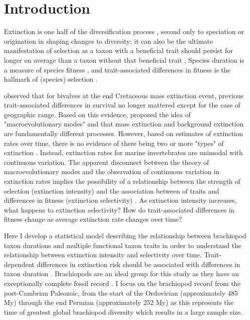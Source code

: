 \documentclass[11pt]{article}
\begin{document}
\newpage{}

\section*{Introduction}

Extinction is one half of the diversification process \citep{Raup1994,Stanley1979,Stanley1975}, second only to speciation or origination in shaping changes to diversity; it can also be the ultimate manifestation of selection as a taxon with a beneficial trait should persist for longer on average than a taxon without that beneficial trait \citep{Jablonski2008a,Rabosky2010b,Raup1994,Stanley1975}. Species duration is a measure of species fitness \citep{Cooper1984}, and trait-associated differences in fitness is the hallmark of (species) selection \citep{Rabosky2010b}.

\citet{Jablonski1986} observed that for bivalves at the end Cretaceous mass extinction event, previous trait-associated differences in survival no longer mattered except for the case of geographic range. Based on this evidence, \citet{Jablonski1986} proposed the idea of "macroevolutionary modes" and that mass extinction and background extinction are fundamentally different processes. However, based on estimates of extinction rates over time, there is no evidence of there being two or more "types" of extinction \citep{Wang2003}. Instead, extinction rates for marine invertebrates are unimodal with continuous variation. The apparent disconnect between the theory of macroevolutionary modes and the observation of continuous variation in extinction rates implies the possibility of a relationship between the strength of selection (extinction intensity) and the association between of traits and differences in fitness (extinction selectivity) \citep{Payne2016}. As extinction intensity increases, what happens to extinction selectivity? How do trait-associated differences in fitness change as average extinction rate changes over time?

Here I develop a statistical model describing the relationship between brachiopod taxon durations and multiple functional taxon traits in order to understand the relationship between extinction intensity and selectivity over time. Trait-dependent differences in extinction risk should be associated with differences in taxon duration \citep{Cooper1984,Rabosky2010b}. Brachiopods are an ideal group for this study as they have an exceptionally complete fossil record \citep{Foote1996e,Foote2000a}. I focus on the brachiopod record from the post-Cambrian Paleozoic, from the start of the Ordovician (approximately 485 My) through the end Permian (approximately 252 My) as this represents the time of greatest global brachiopod diversity \citep{Alroy2010} which results in a large sample size.
\end{document}
